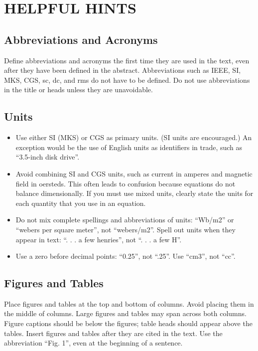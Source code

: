 \documentclass{MIPRO}
\begin{document}
\section{HELPFUL HINTS}

\subsection{Abbreviations and Acronyms}

Define abbreviations and acronyms the first time they are used in the text, even after they have been defined in the abstract. Abbreviations such as IEEE, SI, MKS, CGS, sc, dc, and rms do not have to be defined. Do not use abbreviations in the title or heads unless they are unavoidable.

\subsection{Units}

\begin{itemize}
    \item Use either SI (MKS) or CGS as primary units. (SI units are encouraged.) An exception would be the use of English units as identifiers in trade, such as “3.5-inch disk drive”.
    \item Avoid combining SI and CGS units, such as current in amperes and magnetic field in oersteds. This often leads to confusion because equations do not balance dimensionally. If you must use mixed units, clearly state the units for each quantity that you use in an equation.
    \item Do not mix complete spellings and abbreviations of units: “Wb/m2” or “webers per square meter”, not “webers/m2”. Spell out units when they appear in text: “. . . a few henries”, not “. . . a few H”.
    \item Use a zero before decimal points: “0.25”, not “.25”. Use “cm3”, not “cc”. 
\end{itemize}

\subsection{Figures and Tables}

Place figures and tables at the top and bottom of columns. Avoid placing them in the middle of columns. Large figures and tables may span across both columns. Figure captions should be below the figures; table heads should appear above the tables. Insert figures and tables after they are cited in the text. Use the abbreviation “Fig. 1”, even at the beginning of a sentence.
\end{document}
